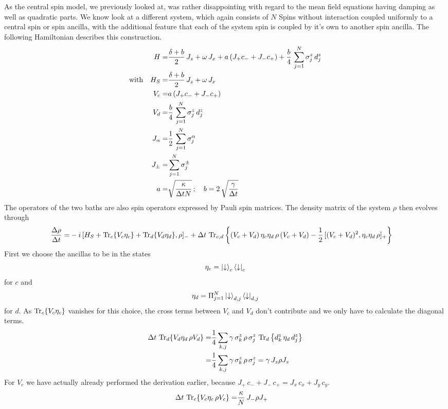 \documentclass{article}
\begin{document}
As the central spin model, we previously looked at, was rather disappointing with regard to the mean field equations having damping as well as quadratic parts. We know look at a different system, which again consists of $N$ Spins without interaction coupled uniformly to a central spin or spin ancilla, with the additional feature that each of the system spin is coupled by it's own to another spin ancilla. The following Hamiltonian describes this construction.
\begin{align*}
    H =& \frac{\delta+b}{2}\,J_z+ \omega\,J_x+a\,(J_+c_- + J_-c_+)+ \frac{b}{4}\,\sum_{j=1}^N\sigma_j^z\, d_j^z\\
    \text{with}\quad H_S=&\frac{\delta+b}{2}\,J_z+ \omega\,J_x\\
    V_c=&a\,(J_+c_- + J_-c_+)\\
    V_d=&\frac{b}{4}\,\sum_{j=1}^N\sigma_j^z\, d_j^z\\
    J_\alpha =&\frac{1}{2}\,\sum_{j=1}^N\sigma_j^\alpha\\
    J_\pm=&\sum_{j=1}^N\sigma_j^\pm\\
    a=&\sqrt{\frac{\kappa}{\Delta tN}}\,;\quad b=2\,\sqrt{\frac{\gamma}{\Delta t}}
\end{align*}
The operators of the two baths are also spin operators expressed by Pauli spin matrices. The density matrix of the system $\rho$ then evolves through
\begin{align*}
    \frac{\Delta\rho}{\Delta t}=&-i\,[H_S+\operatorname{Tr}_c\{V_c\eta_c\}+\operatorname{Tr}_d\{V_d\eta_d\},\rho]_- +\Delta t\,\operatorname{Tr}_{c,d}\left\{ (V_c+V_d)\,\eta_c\eta_d\,\rho\,(V_c+V_d)-\frac{1}{2}\,[(V_c+V_d)^2,\eta_c\eta_d\,\rho]_+\right\}
\end{align*}
First we choose the ancillas to be in the states 
$$\eta_c=\ket{\downarrow}_c\bra{\downarrow}_c$$
for $c$ and 
$$\eta_d=\Pi_{j=1}^N\ket{\downarrow}_{d,j}\bra{\downarrow}_{d,j}$$
for $d$. As $\operatorname{Tr}_c\{V_c\eta_c\}$ vanishes for this choice, the cross terms between $V_c$ and $V_d$ don't contribute and we only have to calculate the diagonal terms.
\begin{align*}
     \Delta t\,\operatorname{Tr}_d\{V_d\eta_d\,\rho V_d\}=&\frac{1}{4}\sum_{k,j}\gamma\,\sigma_k^z\,\rho\,\sigma_j^z\,\operatorname{Tr}_d\left\{ d_k^z\, \eta_d \,d_j^z\right\}\\
     =&\frac{1}{4}\sum_{k,j}\gamma\,\sigma_k^z\,\rho\,\sigma_j^z=\gamma\,J_z\rho J_z
\end{align*}
For $V_c$ we have actually already performed the derivation earlier, because $J_+\,c_-+J_-\,c_+=J_x\,c_x+J_y\,c_y$.
\begin{align*}
    \Delta t\,\operatorname{Tr}_c\{V_c\eta_c\,\rho V_c\}=&\frac{\kappa}{N}\,J_-\rho J_+
\end{align*}
\end{document}
